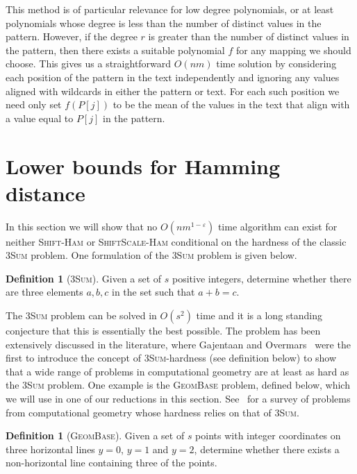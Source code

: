 \documentclass[11pt]{article}
\renewcommand{\epsilon}{\varepsilon}
\newcommand{\sHam}{\textsc{Shift-Ham}\xspace}
\newcommand{\ssHam}{\textsc{ShiftScale-Ham}\xspace}
\newcommand{\threeSUM}{\textsc{3Sum}\xspace}
\newcommand{\geombase}{\textsc{GeomBase}\xspace}
\theoremstyle{plain}
\theoremstyle{definition}
\newtheorem{definition}[theorem]{Definition}
\begin{document}
This method is of particular relevance for low degree polynomials, or at least polynomials whose degree is less than the number of distinct values in the pattern.  However, if the degree $r$ is greater than the number of distinct values in the pattern, then there exists a suitable polynomial $f$ for any  mapping we should choose.  This gives us a straightforward $O(nm)$ time solution by considering each position of the pattern in the text independently and ignoring any values aligned with wildcards in either the pattern or text. For each such position we need only set $f(P[j])$ to be the mean of the values in the text that align with a value equal to $P[j]$ in the pattern.


\section{Lower bounds for Hamming distance}\label{sec:3SUM}

In this section we will show that no $O(nm^{1-\epsilon})$ time algorithm can exist for neither \sHam or \ssHam conditional on the hardness of the classic \threeSUM problem. One formulation of the \threeSUM problem is given below.

\begin{definition}[\threeSUM]
    \label{def:threeSUM}
    Given a set of $s$ positive integers, determine whether there are three elements $a,b,c$ in the set such that $a+b=c$.
\end{definition}

The \threeSUM problem can be solved in $O(s^2)$ time and it is a long standing conjecture that this is essentially the best possible. The problem has been extensively discussed in the literature, where Gajentaan and Overmars~\cite{GO:1995} were the first to introduce the concept of \threeSUM-hardness (see definition below) to show that a wide range of problems in computational geometry are at least as hard as the \threeSUM problem. One example is the \geombase problem, defined below, which we will use in one of our reductions in this section. See~\cite{King:2004} for a survey of problems from computational geometry whose hardness relies on that of \threeSUM.

\begin{definition}[\geombase]
    \label{def:geombase}
    Given a set of $s$ points with integer coordinates on three horizontal lines $y=0$, $y=1$ and $y=2$, determine whether there exists a non-horizontal line containing three of the points.
\end{definition}
\end{document}
